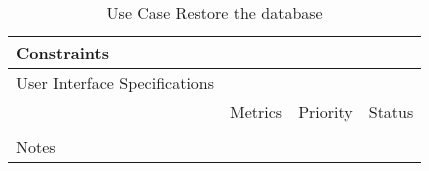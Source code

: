 \begin{table}[H]
\begin{tabularx}{\linewidth}{|l|X|X|X|}
    \hline Constraints                   & \multicolumn{3}{l|}{}                                                                                 \\

    \hline User Interface Specifications & \multicolumn{3}{l|}{}                                                                                 \\

    \hline \multirow{2}{*}{}             & Metrics                                                                           & Priority & Status \\
    \cline{2-4}                          &                                                                                   &          &        \\
    \hline Notes                         & \multicolumn{3}{l|}{}                                                                                 \\
    \hline
  \end{tabularx}
  \caption{Use Case Restore the database}
  \label{tab:use_case_restore_the_database}
\end{table}

